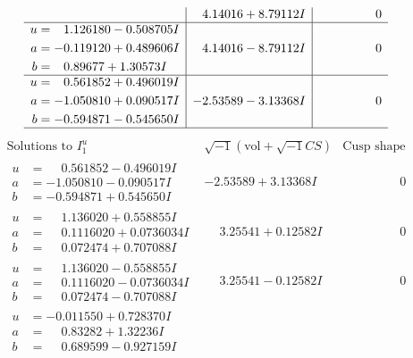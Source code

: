 \documentclass[1p]{elsarticle_modified}
\theoremstyle{definition}
\newcommand{\I}{\sqrt{-1}}
\begin{document}
$$\begin{array}{c|c|c}
 & \phantom{-}4.14016 + 8.79112 I & \phantom{-0.000000 } 0 \\ \hline\begin{aligned}
u &= \phantom{-}1.126180 - 0.508705 I \\
a &= -0.119120 + 0.489606 I \\
b &= \phantom{-}0.89677 + 1.30573 I\end{aligned}
 & \phantom{-}4.14016 - 8.79112 I & \phantom{-0.000000 } 0 \\ \hline\begin{aligned}
u &= \phantom{-}0.561852 + 0.496019 I \\
a &= -1.050810 + 0.090517 I \\
b &= -0.594871 - 0.545650 I\end{aligned}
 & -2.53589 - 3.13368 I & \phantom{-0.000000 } 0\\
 \hline 
 \end{array}$$\newpage$$\begin{array}{c|c|c}  
\text{Solutions to }I^u_{1}& \I (\text{vol} + \sqrt{-1}CS) & \text{Cusp shape}\\
 \hline 
\begin{aligned}
u &= \phantom{-}0.561852 - 0.496019 I \\
a &= -1.050810 - 0.090517 I \\
b &= -0.594871 + 0.545650 I\end{aligned}
 & -2.53589 + 3.13368 I & \phantom{-0.000000 } 0 \\ \hline\begin{aligned}
u &= \phantom{-}1.136020 + 0.558855 I \\
a &= \phantom{-}0.1116020 + 0.0736034 I \\
b &= \phantom{-}0.072474 + 0.707088 I\end{aligned}
 & \phantom{-}3.25541 + 0.12582 I & \phantom{-0.000000 } 0 \\ \hline\begin{aligned}
u &= \phantom{-}1.136020 - 0.558855 I \\
a &= \phantom{-}0.1116020 - 0.0736034 I \\
b &= \phantom{-}0.072474 - 0.707088 I\end{aligned}
 & \phantom{-}3.25541 - 0.12582 I & \phantom{-0.000000 } 0 \\ \hline\begin{aligned}
u &= -0.011550 + 0.728370 I \\
a &= \phantom{-}0.83282 + 1.32236 I \\
b &= \phantom{-}0.689599 - 0.927159 I\end{aligned}

\end{array}$$
\end{document}

